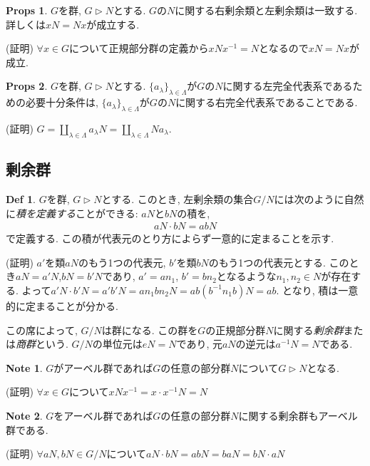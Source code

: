 \documentclass[dvipdfmx]{jsarticle}
\theoremstyle{definition}
\newtheorem{props}{Props}
\newtheorem{definition}{Def}
\newtheorem{note}{Note}
\numberwithin{equation}{section}
\numberwithin{props}{section}
\numberwithin{definition}{section}
\numberwithin{note}{section}
\begin{document}
\begin{props}
     $G$を群, $G\rhd N$とする. $G$の$N$に関する右剰余類と左剰余類は一致する. 
     詳しくは$xN=Nx$が成立する.
\end{props}
(証明) $\forall x\in G$について正規部分群の定義から$xNx^{-1}=N$となるので$xN=Nx$が成立.

\begin{props}
     $G$を群, $G\rhd N$とする. $\lbrace a_\lambda\rbrace_{\lambda\in \Lambda}$が$G$の$N$に関する左完全代表系であるための必要十分条件は, $\lbrace a_\lambda\rbrace_{\lambda\in \Lambda}$が$G$の$N$に関する右完全代表系であることである.
\end{props}
(証明) $G=\coprod_{\lambda\in \Lambda}a_\lambda N=\coprod_{\lambda\in \Lambda}N a_\lambda$.
\subsection{剰余群}
\begin{definition}
     $G$を群, $G\rhd N$とする. このとき, 左剰余類の集合$G/N$には次のように自然に\emph{積を定義する}ことができる: $aN$と$bN$の積を,
     \begin{align}
          aN\cdot bN=abN
     \end{align}
     で定義する. この積が代表元のとり方によらず一意的に定まることを示す.

     (証明) $a'$を類$aN$のもう1つの代表元, $b'$を類$bN$のもう1つの代表元とする.
     このとき$aN=a'N$,$bN=b'N$であり, $a'=an_1$, $b'=bn_2$となるような$n_1,n_2\in N$が存在する.
     よって$a'N\cdot b'N=a'b'N=an_1bn_2N=ab(b^{-1}n_1b)N=ab$. となり, 積は一意的に定まることが分かる.

     この席によって, $G/N$は群になる. この群を$G$の正規部分群$N$に関する\emph{剰余群}または\emph{商群}という. $G/N$の単位元は$eN=N$であり, 元$aN$の逆元は$a^{-1}N=N$である. 
\end{definition}
\begin{note}
     $G$がアーベル群であれば$G$の任意の部分群$N$について$G\rhd N$となる.
\end{note}
(証明) $\forall x \in G$について$xNx^{-1}=x\cdot x^{-1}N=N$
\begin{note}
     $G$をアーベル群であれば$G$の任意の部分群$N$に関する剰余群もアーベル群である.
\end{note}
(証明) $\forall aN,bN\in G/N$について$aN\cdot b N=ab N=baN=bN\cdot aN$
\end{document}
